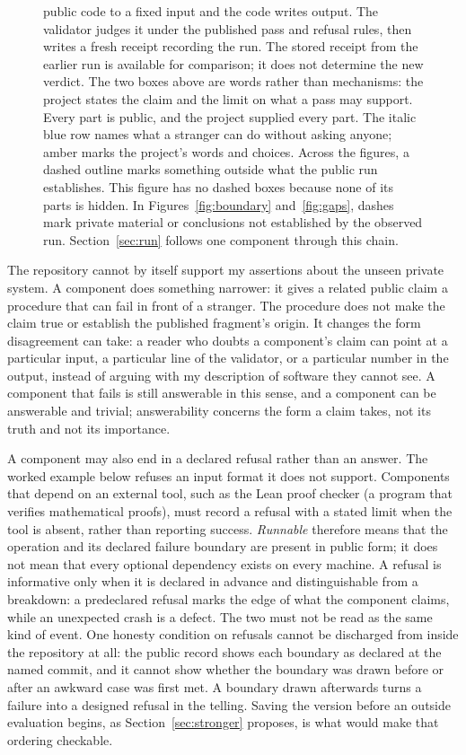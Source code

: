 \documentclass[11pt]{article}
\begin{document}
\begin{figure}[t]
{public code to a fixed input and the code writes output. The validator judges it
under the published pass and refusal rules, then writes a fresh receipt recording
the run. The stored receipt from the earlier run is available for comparison; it
does not determine the new verdict. The two
boxes above are words rather than mechanisms: the project states the claim and
the limit on what a pass may support. Every part is public, and the project
supplied every part. The italic blue row names what a stranger can do without
asking anyone; amber marks the project's words and choices. Across the figures,
a dashed outline marks something outside what the public run establishes. This
figure has no dashed boxes because none of its parts is hidden. In
Figures~\ref{fig:boundary} and~\ref{fig:gaps}, dashes mark private material or
conclusions not established by the observed run. Section~\ref{sec:run} follows
one component through this chain.}
\label{fig:contract}
\end{figure}

The repository cannot by itself support my assertions about the unseen private
system. A component does something narrower: it gives a related public claim a
procedure that can fail in front of a stranger. The procedure
does not make the claim true or establish the published fragment's origin. It
changes the form disagreement can take: a reader who doubts a component's
claim can point at a particular input, a particular line of the validator, or a
particular number in the output, instead of arguing with my description of
software they cannot see. A component that fails is still answerable in
this sense, and a component can be answerable and trivial; answerability
concerns the form a claim takes, not its truth and not its importance.

A component may also end in a declared refusal rather than an answer. The
worked example below refuses an input format it does not support. Components
that depend on an external tool, such as the Lean proof checker (a program
that verifies mathematical proofs), must record a refusal with a stated limit
when the tool is absent, rather than reporting success.
\emph{Runnable} therefore means that the operation and its declared failure
boundary are present in public form; it does not mean that every optional
dependency exists on every machine. A refusal is informative only when it is
declared in advance and distinguishable from a breakdown: a predeclared
refusal marks the edge of what the component claims, while an unexpected
crash is a defect. The two must not be read as the same kind of event. One
honesty condition on refusals cannot be discharged from inside the
repository at all: the public record shows each boundary as declared at the
named commit, and it cannot show whether the boundary was drawn before or
after an awkward case was first met. A boundary drawn afterwards turns a
failure into a designed refusal in the telling. Saving the version before
an outside evaluation begins, as Section~\ref{sec:stronger} proposes, is
what would make that ordering checkable.
\end{document}
